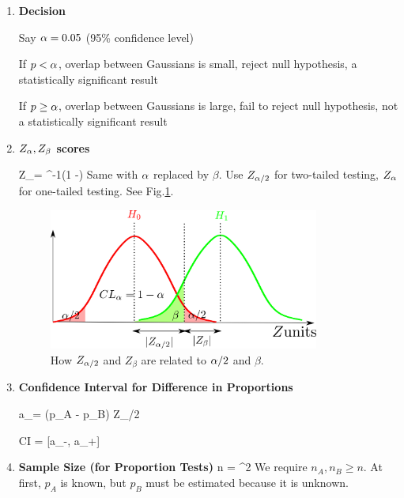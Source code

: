 \begin{enumerate}
\item {\bf Decision}

Say $\alpha=0.05$ (95\% confidence level)

If $p< \alpha$,  overlap between Gaussians is small, reject null hypothesis,
a statistically significant result

If $p \geq \alpha$, overlap between Gaussians is large, fail to reject null hypothesis, not a statistically significant result

\item {\bf $Z_\alpha, Z_\beta$  scores}

\beq
Z_\alp=
\Phi^{-1}(1 -\alp)
\eeq
Same with $\alpha$ replaced by $\beta$.
Use $Z_{\alpha/2}$ for two-tailed testing, $Z_\alpha$ for one-tailed testing. See Fig.\ref{fig-alp-beta-z}.

\begin{figure}[h!]
\centering
\includegraphics[width=3.5in]
{a-b-testing/alp-beta-z.png}
\caption{How $Z_{\alpha/2}$ and $Z_\beta$ are
related to $\alpha/2$ and $\beta$.}
\label{fig-alp-beta-z}
\end{figure}

\item {\bf Confidence Interval for Difference in Proportions} 

\beq
a_\pm = (p_A - p_B) \pm Z_{\alpha/2} 
\eeq

\beq
CI = [a_-, a_+]
\eeq



\item {\bf Sample Size 
(for Proportion Tests)}
\beq
n = 
^2
\eeq
We require $n_A, n_B\geq n$.
At first, $p_A$ is known, but $p_B$ 
must be
estimated because it is unknown.
\end{enumerate}
